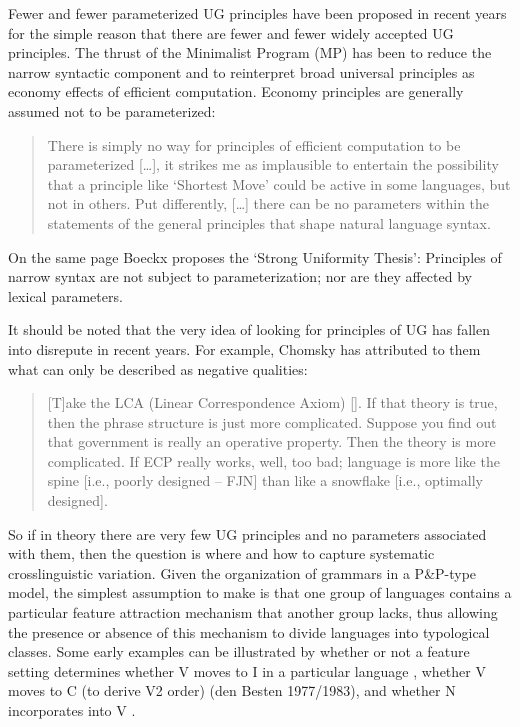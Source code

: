 \documentclass[output=paper,
modfonts
]{LSP/langsci}
\begin{document}
Fewer and fewer parameterized UG principles have been proposed in recent
years for the simple reason that there are fewer and fewer widely
accepted UG principles. The thrust of the Minimalist Program (MP) has
been to reduce the narrow syntactic component and to reinterpret broad
universal principles as economy effects of efficient computation.
Economy principles are generally assumed not to be parameterized:

\begin{quote}
There is simply no way for principles of efficient computation to be
parameterized {[}\ldots{]}, it strikes me as implausible to entertain
the possibility that a principle like `Shortest Move' could be active in
some languages, but not in others. Put differently, {[}\ldots{]} there
can be no parameters within the statements of the general principles
that shape natural language syntax. \citep[210]{boeckx2011}
\end{quote}

On the same page Boeckx proposes the `Strong Uniformity Thesis':
Principles of narrow syntax are not subject to parameterization; nor are
they affected by lexical parameters.

It should be noted that the very idea of looking for principles of UG
has fallen into disrepute in recent years. For example, Chomsky has
attributed to them what can only be described as negative qualities:

\begin{quote}
{[}T{]}ake the LCA (Linear Correspondence Axiom) [\citealt{kayne1994}]. If
that theory is true, then the phrase structure is just more complicated.
Suppose you find out that government is really an operative property.
Then the theory is more complicated. If ECP really works, well, too bad;
language is more like the spine {[}i.e., poorly designed  --  FJN{]} than
like a snowflake {[}i.e., optimally designed{]}. \citep[136]{chomsky2002}
\end{quote}

So if in theory there are very few UG principles and no parameters
associated with them, then the question is where and how to capture
systematic crosslinguistic variation. Given the organization of grammars
in a P\&P-type model, the simplest assumption to make is that one group
of languages contains a particular feature attraction mechanism that
another group lacks, thus allowing the presence or absence of this
mechanism to divide languages into typological classes. Some early
examples can be illustrated by whether or not a feature setting
determines whether V moves to I in a particular language \citep{emonds1978,pollock1989}, whether V moves to C (to derive V2 order) (den Besten
1977/1983), and whether N incorporates into V \citep{baker1988}.
\end{document}

